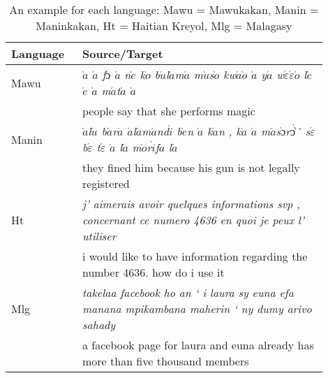 
\begin{table*}
	\setlength{\tabcolsep}{4.5pt}
	\small
	\begin{tabular}{p{0.2\linewidth}p{0.7\linewidth}}
	\toprule
	Language & Source/Target \\
	\toprule
	Mawu & \emph{$\grave{a}$ $\grave{a}$ f$\acute{ɔ}$ $\acute{a}$ n$\grave{e}$ k$\grave{o}$ b$\acute{u}$l$\grave{a}$m$\acute{a}$ m$\grave{u}$s$\grave{o}$ kw$\acute{a}$$\grave{o}$ $\grave{a}$ y$\acute{a}$ w$\acute{\varepsilon}$$\acute{\varepsilon}$$\acute{o}$ l$\acute{e}$ $\acute{e}$ $\grave{a}$ m$\acute{a}$t$\acute{a}$
	$\grave{a}$} \\
	 & people say that she performs magic\\
	\midrule
	Manin & \emph{$\grave{a}$l$\grave{u}$  b$\acute{a}$r$\acute{a}$ $\acute{a}$l$\acute{a}$m$\acute{a}$nd$\acute{i}$ b$\grave{e}$n $\grave{a}$ k$\grave{a}$n , k$\grave{a}$ $\grave{a}$ m$\acute{a}$s$\grave{ɔ}$r$\grave{ɔ̀}$̀  s$\acute{\varepsilon}$b$\acute{\varepsilon}$ t$\acute{\varepsilon}$ $\grave{a}$ l$\acute{a}$ 
	m$\grave{o}$r$\grave{i}$f$\grave{a}$ l$\acute{a}$} \\

	  & they fined him because his gun is not legally registered\\
	\midrule
	Ht & \emph{j' aimerais avoir quelques informations svp , concernant ce numero 4636 en quoi je peux l' utiliser} \\

	&	 i would like to have information regarding the number 4636. how do i use it\\
	\midrule
	
	Mlg & \emph{takelaa facebook ho an ` i laura sy euna efa manana mpikambana maherin  ` ny dumy arivo sahady} \\
	 & a facebook page for laura and euna already has more than five thousand members\\
	\bottomrule
	\end{tabular}
	\caption{An example for each language: Mawu = Mawukakan, Manin = Maninkakan, Ht = Haitian Kreyol, Mlg = Malagasy}
	\label{table:example_each}
\end{table*}
		
